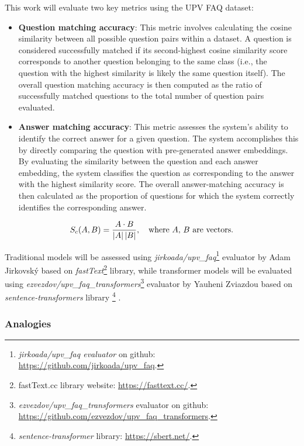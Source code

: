 This work will evaluate two key metrics using the UPV FAQ dataset:
\begin{itemize}
  \item \textbf{Question matching accuracy}:
 This metric involves calculating the cosine similarity  between all possible question pairs within a dataset.
 A question is considered successfully matched if its second-highest cosine similarity score corresponds to another question belonging to the same class (i.e., the question with the highest similarity is likely the same question itself). 
 The overall question matching accuracy is then computed as the ratio of successfully matched questions to the total number of question pairs evaluated.  
  \item \textbf{Answer matching accuracy}:
 This metric assesses the system's ability to identify the correct answer for a given question.
 The system accomplishes this by directly comparing the question with pre-generated answer embeddings.
 By evaluating the similarity  between the question and each answer embedding, the system classifies the question as corresponding to the answer with the highest similarity score.
 The overall answer-matching accuracy is then calculated as the proportion of questions for which the system correctly identifies the corresponding answer.  
\end{itemize}

\begin{equation}
 S_c(A,B) = {{A \cdot B} \over {\left\lvert A\right\rvert \left\lvert B\right\rvert}}, \quad \text{where $A$, $B$ are vectors.}
  \label{eq:cosine_similarity}
\end{equation}

Traditional models will be assessed using \textit{jirkoada/upv\_faq}\footnote{\textit{jirkoada/upv\_faq evaluator} on github: \url{https://github.com/jirkoada/upv_faq}.}
evaluator by Adam Jirkovský based on \textit{fastText}\footnote{\label{footnote:fasttex_lib}fastText.cc library website: \url{https://fasttext.cc/}.} library,
while transformer models will be evaluated using \textit{ezvezdov/upv\_faq\_transformers}\footnote{\textit{ezvezdov/upv\_faq\_transformers} evaluator on github: \url{https://github.com/ezvezdov/upv_faq_transformers}.}
evaluator by Yauheni Zviazdou based on \textit{sentence-transformers} library \footnote{\label{footnote:SentenceTransformers}\textit{sentence-transformer} library: \url{https://sbert.net/}.} \cite{reimers2019sentencebert}.


\subsubsection{Analogies}

